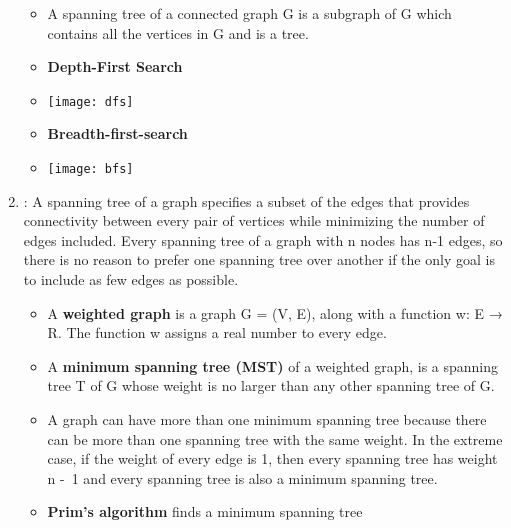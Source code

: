 \documentclass[12pt,a4paper]{article}
\begin{document}
\begin{enumerate}
  \begin{itemize}
    \item A spanning tree of a connected graph G is a subgraph of G which contains all the vertices in G and is a tree.
    \item \textbf{Depth-First Search}
    \item[] \texttt{[image: dfs]}
     \item \textbf{Breadth-first-search}
    \item[] \texttt{[image: bfs]}
  \end{itemize}
  \item {}: A spanning tree of a graph specifies a subset of the edges that provides connectivity between every pair of vertices while minimizing the number of edges included. Every spanning tree of a graph with n nodes has n-1 edges, so there is no reason to prefer one spanning tree over another if the only goal is to include as few edges as possible.
  \begin{itemize}
    \item A \textbf{weighted graph} is a graph G = (V, E), along with a function w: E → R. The function w assigns a real number to every edge.
    \item A \textbf{minimum spanning tree (MST)} of a weighted graph, is a spanning tree T of G whose weight is no larger than any other spanning tree of G.
    \item A graph can have more than one minimum spanning tree because there can be more than one spanning tree with the same weight. In the extreme case, if the weight of every edge is 1, then every spanning tree has weight n -\ 1 and every spanning tree is also a minimum spanning tree.
    \item \textbf{Prim's algorithm} finds a minimum spanning tree
  \end{itemize}
\end{enumerate}
\end{document}
